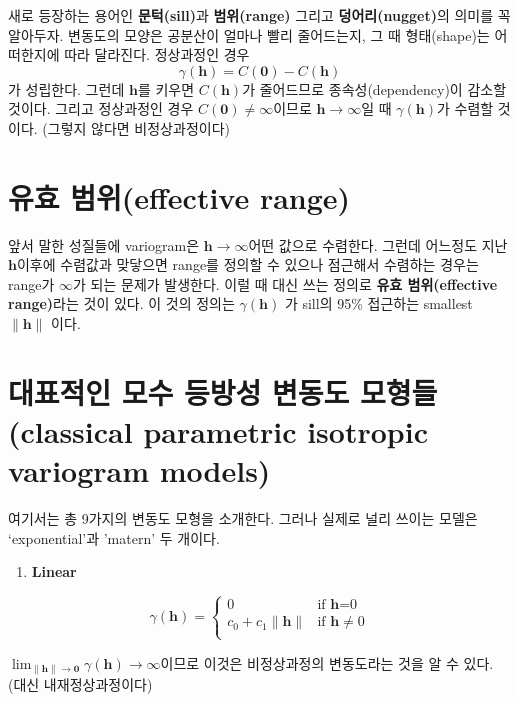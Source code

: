 \documentclass[b5paper,]{scrbook}
\providecommand{\tightlist}{%
  \setlength{\itemsep}{0pt}\setlength{\parskip}{0pt}}
\theoremstyle{plain}
\theoremstyle{definition}
\numberwithin{equation}{section}
\begin{document}
새로 등장하는 용어인 \textbf{문턱(sill)}과 \textbf{범위(range)} 그리고
\textbf{덩어리(nugget)}의 의미를 꼭 알아두자. 변동도의 모양은 공분산이
얼마나 빨리 줄어드는지, 그 때 형태(shape)는 어떠한지에 따라 달라진다.
정상과정인 경우 \[\gamma(\mathbf{h})=C(\mathbf{0})-C(\mathbf{h})\] 가
성립한다. 그런데 \(\mathbf{h}\)를 키우면 \(C(\mathbf{h})\)가 줄어드므로
종속성(dependency)이 감소할 것이다. 그리고 정상과정인 경우
\(C(\mathbf{0})\neq \infty\)이므로 \(\mathbf{h} \rightarrow \infty\)일
때 \(\gamma(\mathbf{h})\)가 수렴할 것이다. (그렇지 않다면
비정상과정이다)

\section{유효 범위(effective range)}\label{-effective-range}

앞서 말한 성질들에 variogram은 \(\mathbf{h} \rightarrow \infty\)어떤
값으로 수렴한다. 그런데 어느정도 지난 \(\mathbf{h}\)이후에 수렴값과
맞닿으면 range를 정의할 수 있으나 점근해서 수렴하는 경우는 range가
\(\infty\)가 되는 문제가 발생한다. 이럴 때 대신 쓰는 정의로 \textbf{유효
범위(effective range)}라는 것이 있다. 이 것의 정의는
\(\gamma(\mathbf{h})\) 가 sill의 95\% 접근하는 smallest
\(\|\mathbf{h}\|\) 이다.

\section{대표적인 모수 등방성 변동도 모형들(classical parametric
isotropic variogram
models)}\label{----classical-parametric-isotropic-variogram-models}

여기서는 총 9가지의 변동도 모형을 소개한다. 그러나 실제로 널리 쓰이는
모델은 `exponential'과 'matern' 두 개이다.

\begin{enumerate}
\def\labelenumi{\arabic{enumi}.}
\tightlist
\item
  \textbf{Linear}
\end{enumerate}

\[
\gamma(\mathbf{h})= \left\{ \begin{array}{ll}
0 & \textrm{if $\mathbf{h}$=0}\\
c_{0}+c_{1}\| \mathbf{h}\| & \textrm{if $\mathbf{h}\neq 0$}\\
\end{array} \right.
\]

\(\lim_{\|\mathbf{h}\| \rightarrow \mathbf{0}}\gamma(\mathbf{h}) \rightarrow \infty\)이므로
이것은 비정상과정의 변동도라는 것을 알 수 있다. (대신 내재정상과정이다)
\end{document}
